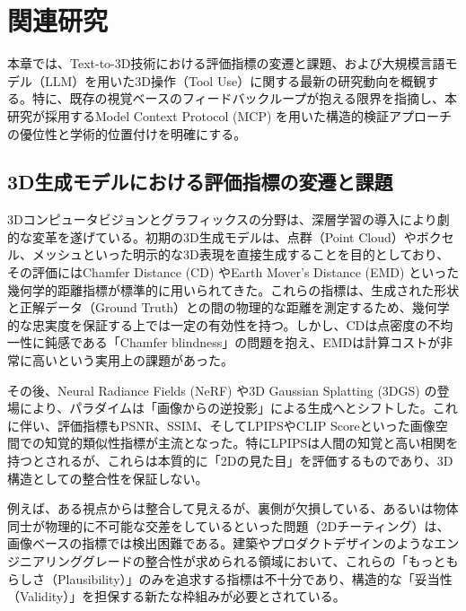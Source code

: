 \documentclass[dvipdfmx, a4paper, 9pt]{deimj}
\begin{document}
\section{関連研究}

本章では、Text-to-3D技術における評価指標の変遷と課題、および大規模言語モデル（LLM）を用いた3D操作（Tool Use）に関する最新の研究動向を概観する。特に、既存の視覚ベースのフィードバックループが抱える限界を指摘し、本研究が採用するModel Context Protocol (MCP) を用いた構造的検証アプローチの優位性と学術的位置付けを明確にする。

\subsection{3D生成モデルにおける評価指標の変遷と課題}

3Dコンピュータビジョンとグラフィックスの分野は、深層学習の導入により劇的な変革を遂げている。初期の3D生成モデルは、点群（Point Cloud）やボクセル、メッシュといった明示的な3D表現を直接生成することを目的としており、その評価にはChamfer Distance (CD) やEarth Mover's Distance (EMD) といった幾何学的距離指標が標準的に用いられてきた\cite{fan2017point,nichol2022point}。これらの指標は、生成された形状と正解データ（Ground Truth）との間の物理的な距離を測定するため、幾何学的な忠実度を保証する上では一定の有効性を持つ。しかし、CDは点密度の不均一性に鈍感である「Chamfer blindness」の問題を抱え、EMDは計算コストが非常に高いという実用上の課題があった。

その後、Neural Radiance Fields (NeRF)\cite{mildenhall2020nerf} や3D Gaussian Splatting (3DGS)\cite{kerbl20233dgs} の登場により、パラダイムは「画像からの逆投影」による生成へとシフトした。これに伴い、評価指標もPSNR、SSIM、そしてLPIPS\cite{zhang2018lpips}やCLIP Score\cite{radford2021clip}といった画像空間での知覚的類似性指標が主流となった。特にLPIPSは人間の知覚と高い相関を持つとされるが、これらは本質的に「2Dの見た目」を評価するものであり、3D構造としての整合性を保証しない。

例えば、ある視点からは整合して見えるが、裏側が欠損している、あるいは物体同士が物理的に不可能な交差をしているといった問題（2Dチーティング）は、画像ベースの指標では検出困難である\cite{poole2022dreamfusion}。建築やプロダクトデザインのようなエンジニアリンググレードの整合性が求められる領域において、これらの「もっともらしさ（Plausibility）」のみを追求する指標は不十分であり、構造的な「妥当性（Validity）」を担保する新たな枠組みが必要とされている。
\end{document}
